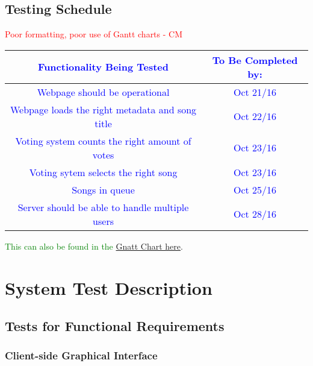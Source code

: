 \documentclass[12pt, titlepage]{article}
\begin{document}
\subsection{Testing Schedule}
\textcolor{red}{Poor formatting, poor use of Gantt charts - CM} \\
\begin{center}
\begin{table}[H]
\begin{tabularx}{\textwidth}{ c | c }
\textcolor{blue}{Functionality Being Tested} & \textcolor{blue}{To Be Completed by:} \\
\hline
\textcolor{blue}{Webpage should be operational} & \textcolor{blue}{Oct 21/16} \\
\textcolor{blue}{Webpage loads the right metadata and song title} & \textcolor{blue}{Oct 22/16} \\
\textcolor{blue}{Voting system counts the right amount of votes} & \textcolor{blue}{Oct 23/16} \\
\textcolor{blue}{Voting sytem selects the right song} & \textcolor{blue}{Oct 23/16} \\
\textcolor{blue}{Songs in queue} & \textcolor{blue}{Oct 25/16} \\
\textcolor{blue}{Server should be able to handle multiple users} & \textcolor{blue}{Oct 28/16} \\
\end{tabularx}
\end{table}
\end{center}

\textcolor{green}{This can also be found in the} \href{run:d:/ProjectSchedule/DJSGanttChart.gan}{Gnatt Chart here}.

\section{System Test Description}

\subsection{Tests for Functional Requirements}

\subsubsection{Client-side Graphical Interface}
\end{document}
